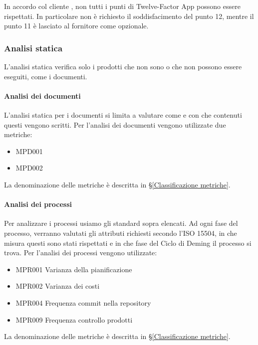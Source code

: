 		In accordo col cliente \II, non tutti i punti di Twelve-Factor App possono essere rispettati. In particolare non è richiesto il soddisfacimento del punto 12, mentre il punto 11 è lasciato al fornitore come opzionale.
		
		
		\subsubsection{Analisi statica}\label{AnalisiStatica}
		L'analisi statica verifica solo i prodotti che non sono o che non possono essere eseguiti, come i documenti.

			\paragraph{Analisi dei documenti}
			L'analisi statica per i documenti si limita a valutare come e con che contenuti questi vengono scritti.
			Per l'analisi dei documenti vengono utilizzate due metriche:

			\begin{itemize}
				\item MPD001
				\item MPD002
			\end{itemize}
			
			La denominazione delle metriche è descritta in \S\ref{Classificazione metriche}.

			\paragraph{Analisi dei processi}
			Per analizzare i processi usiamo gli standard sopra elencati. Ad ogni fase del processo, verranno valutati gli attributi richiesti secondo
			l'ISO 15504, in che misura questi sono stati rispettati e in che fase del Ciclo di Deming il processo si trova.
			Per l'analisi dei processi vengono utilizzate:

			\begin{itemize}
				\item MPR001 Varianza della pianificazione
				\item MPR002 Varianza dei costi
				\item MPR004 Frequenza commit nella repository
				\item MPR009 Frequenza controllo prodotti
			\end{itemize}

			La denominazione delle metriche è descritta in \S\ref{Classificazione metriche}.
		
